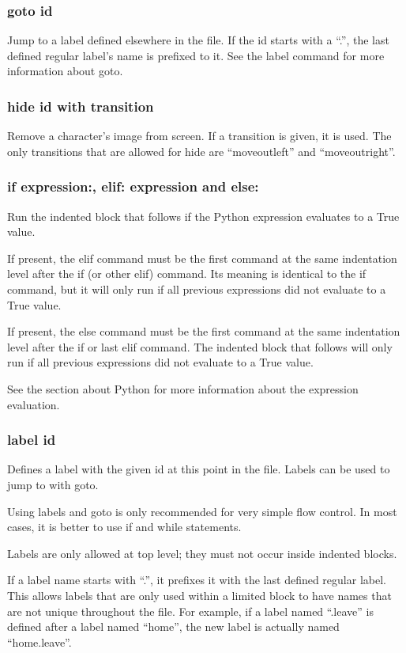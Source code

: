 \documentclass{article}
\begin{document}
\subsubsection{goto id}
Jump to a label defined elsewhere in the file. If the id starts with a ``.'',
the last defined regular label's name is prefixed to it. See the label command
for more information about goto.

\subsubsection{hide id with transition}
Remove a character's image from screen. If a transition is given, it is used.
The only transitions that are allowed for hide are ``moveoutleft'' and
``moveoutright''.

\subsubsection{if expression:, elif: expression and else:}
Run the indented block that follows if the Python expression evaluates to a
True value.

If present, the elif command must be the first command at the same indentation
level after the if (or other elif) command. Its meaning is identical to the if
command, but it will only run if all previous expressions did not evaluate to a
True value.

If present, the else command must be the first command at the same indentation
level after the if or last elif command. The indented block that follows will
only run if all previous expressions did not evaluate to a True value.

See the section about Python for more information about the expression
evaluation.

\subsubsection{label id}
Defines a label with the given id at this point in the file. Labels can be used
to jump to with goto.

Using labels and goto is only recommended for very simple flow control. In most
cases, it is better to use if and while statements.

Labels are only allowed at top level; they must not occur inside indented
blocks.

If a label name starts with ``.'', it prefixes it with the last defined regular
label. This allows labels that are only used within a limited block to have
names that are not unique throughout the file. For example, if a label named
``.leave'' is defined after a label named ``home'', the new label is actually
named ``home.leave''.
\end{document}
